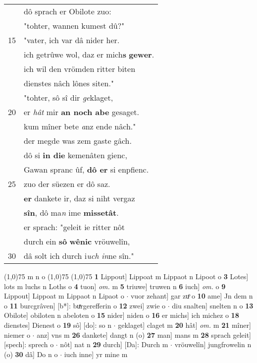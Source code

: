 \documentclass[8pt,a4paper,notitlepage]{article}
\begin{document}
\begin{table}[ht]
\begin{minipage}[t]{0.5\linewidth}
\begin{tabular}{rl}
 & dô sprach er Obilote zuo:\\ 
 & "tohter, wannen kumest dû?"\\ 
15 & "vater, ich var dâ nider her.\\ 
 & ich getrûwe wol, daz er mich\textbf{s} \textbf{gewer}.\\ 
 & ich wil den vrömden ritter biten\\ 
 & dienstes nâch lônes siten."\\ 
 & "tohter, sô sî dir \textit{ge}klaget,\\ 
20 & er \textit{hât} mir \textbf{an noch abe} gesaget.\\ 
 & kum mîner bete \textit{a}nz ende nâch."\\ 
 & der megde was zem gaste gâch.\\ 
 & dô si \textbf{in die} kemenâten gienc,\\ 
 & Gawan spranc ûf, \textbf{dô er} si enpfienc.\\ 
25 & zuo der süezen er dô saz.\\ 
 & \textbf{er} dankete ir, daz si niht vergaz\\ 
 & \textbf{sîn}, dô ma\textit{n} ime \textbf{missetât}.\\ 
 & er sprach: "geleit ie ritter nôt\\ 
 & durch ein \textbf{sô} \textbf{wênic} vröuwelîn,\\ 
30 & dâ solt ich durch i\textit{uch in}ne sîn."\\ 
\end{tabular}
\scriptsize
\line(1,0){75} \newline
m n o \newline
\line(1,0){75} \newline
\newline
\line(1,0){75} \newline
\textbf{1} Lippout] Lippoat m Lippaot n Lipoot o \textbf{3} Lotes] lots m luchs n Loths o \textbf{4} tuon] \textit{om.} m \textbf{5} triuwe] truwen n \textbf{6} iuch] \textit{om.} o \textbf{9} Lippout] Lippoat m Lippaot n Lipaot o  $\cdot$ vuor zehant] gar zuͦ o \textbf{10} ame] Jn dem n o \textbf{11} burcgrâven] [b*]: buͯrgerefferin o \textbf{12} zwei] zwie o  $\cdot$ diu snalten] snelten n o \textbf{13} Obilote] obiloten n abeloten o \textbf{15} nider] niden o \textbf{16} er michs] ich michez o \textbf{18} dienstes] Dienest o \textbf{19} sô] [do]: so n  $\cdot$ geklaget] claget m \textbf{20} hât] \textit{om.} m \textbf{21} mîner] niemer o  $\cdot$ anz] vns m \textbf{26} dankete] dangt n (o) \textbf{27} man] mans m \textbf{28} sprach geleit] [spech]: sprech o  $\cdot$ nôt] nat n \textbf{29} durch] [Da]: Durch m  $\cdot$ vröuwelîn] jungfrowelin n (o) \textbf{30} dâ] Do n o  $\cdot$ iuch inne] yr mine m \newline
\end{minipage}
\end{table}
\end{document}

